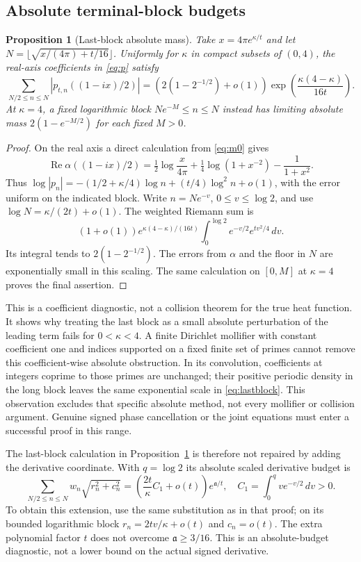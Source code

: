 \documentclass[11pt]{article}
\numberwithin{equation}{section}
\newtheorem{proposition}[theorem]{Proposition}
\theoremstyle{definition}
\theoremstyle{remark}
\DeclareMathOperator{\Rea}{Re}
\newcommand{\dd}{\,d}
\begin{document}
\subsection{Absolute terminal-block budgets}

\begin{proposition}[Last-block absolute mass]\label{prop:absmass}
Take $x=4\pi e^{\kappa/t}$ and let
$N=\lfloor\sqrt{x/(4\pi)+t/16}\rfloor$. Uniformly for $\kappa$
in compact subsets of $(0,4)$, the real-axis coefficients in
\eqref{eq:p} satisfy
\begin{equation}\label{eq:lastblock}
 \sum_{N/2\le n\le N}|p_{t,n}((1-ix)/2)|
 =\left(2(1-2^{-1/2})+o(1)\right)
    \exp\left(\frac{\kappa(4-\kappa)}{16t}\right).
\end{equation}
At $\kappa=4$, a fixed logarithmic block
$Ne^{-M}\le n\le N$ instead has limiting absolute mass
$2(1-e^{-M/2})$ for each fixed $M>0$.
\end{proposition}
\begin{proof}
On the real axis a direct calculation from \eqref{eq:m0} gives
\[
 \Rea\alpha((1-ix)/2)
 =\tfrac12\log\frac{x}{4\pi}
      +\tfrac14\log(1+x^{-2})-\frac1{1+x^2}.
\]
Thus
$\log|p_n|=-(1/2+\kappa/4)\log n+(t/4)\log^2n+o(1)$,
with the error uniform on the indicated block. Write
$n=Ne^{-v}$, $0\le v\le\log2$, and use
$\log N=\kappa/(2t)+o(1)$. The weighted Riemann sum is
\[
 (1+o(1))e^{\kappa(4-\kappa)/(16t)}
 \int_0^{\log2}e^{-v/2}e^{tv^2/4}\dd v.
\]
Its integral tends to $2(1-2^{-1/2})$. The errors from $\alpha$
and the floor in $N$ are exponentially small in this scaling.
The same calculation on $[0,M]$ at $\kappa=4$ proves the final
assertion.
\end{proof}

This is a coefficient diagnostic, not a collision theorem for the
true heat function. It shows why treating the last block as a small
absolute perturbation of the leading term fails for $0<\kappa<4$.
A finite Dirichlet mollifier with constant coefficient one and
indices supported on a fixed finite set of primes cannot remove
this coefficient-wise absolute obstruction. In its convolution,
coefficients at integers coprime to those primes are unchanged;
their positive periodic density in the long block leaves the same
exponential scale in \eqref{eq:lastblock}. This observation excludes
that specific absolute method, not every mollifier or collision
argument. Genuine signed phase cancellation or the joint equations
must enter a successful proof in this range.

The last-block calculation in
Proposition~\ref{prop:absmass} is therefore not repaired by adding the
derivative coordinate. With $q=\log2$ its absolute scaled derivative
budget is
\begin{equation}\label{sc:derivativemass}
 \sum_{N/2\le n\le N}w_n\sqrt{r_n^2+c_n^2}
 =\left(\frac{2t}{\kappa}C_1+o(t)\right)e^{\mathfrak a/t},
 \quad C_1=\int_0^qv e^{-v/2}\dd v>0.
\end{equation}
To obtain this extension, use the same substitution as in that proof;
on its bounded logarithmic block $r_n=2tv/\kappa+o(t)$ and $c_n=o(t)$.
The extra polynomial factor $t$ does not overcome
$\mathfrak a\ge3/16$. This is an absolute-budget diagnostic, not a
lower bound on the actual signed derivative.
\end{document}

